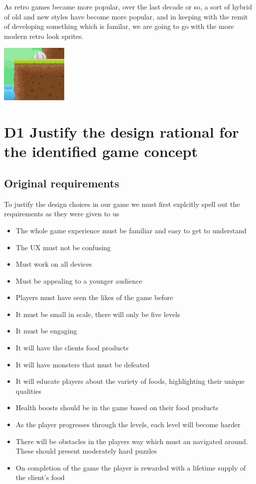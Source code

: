 \documentclass{article}
\begin{document}
As retro games became more popular, over the last decade or so, a sort of hybrid of old and new styles have become more popular, and in keeping with the remit of developing something which is familar, we are going to go with the more modern retro look sprites.

\includegraphics[scale=0.5]{SoftSprite}


\section{D1 Justify the design rational for the identified game concept}


\subsection{Original requirements}
To justify the design choices in our game we must first explcitly spell out the requirements as they were given to us

\begin{itemize}
\item The whole game experience must be familiar and easy to get to understand
\item The UX must not be confusing
\item Must work on all devices
\item Must be appealing to a younger audience
\item Players must have seen the likes of the game before
\item It must be small in scale, there will only be five levels
\item It must be engaging
\item It will have the clients food products
\item It will have monsters that must be defeated
\item It will educate players about the variety of foods, highlighting their unique qualities
\item Health boosts should be in the game based on their food products
\item As the player progresses through the levels, each level will become harder
\item There will be obstacles in the players way which must an navigated around. These should present moderately hard puzzles
\item On completion of the game the player is rewarded with a lifetime supply of the client's food
\end{itemize}
\end{document}
